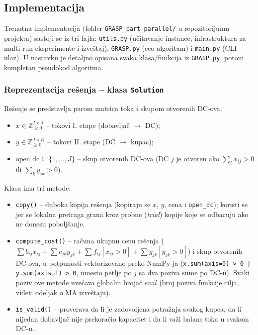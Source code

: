 \documentclass[12pt,a4paper]{article}
\begin{document}
\subsection{Implementacija}

Trenutna implementacija (folder \texttt{GRASP\_part\_parallel/} u repozitorijumu
projekta) sastoji se iz tri fajla: \texttt{utils.py} (učitavanje instance,
infrastruktura za multi-run eksperimente i izveštaj), \texttt{GRASP.py}
(ceo algoritam) i \texttt{main.py} (CLI ulaz). U nastavku je detaljno
opisana svaka klasa/funkcija iz \texttt{GRASP.py}, potom kompletan
pseudokod algoritma.

\subsubsection{Reprezentacija rešenja -- klasa \texttt{Solution}}

Rešenje se predstavlja parom matrica toka i skupom otvorenih DC-ova:
\begin{itemize}
  \item $x \in \mathbb{Z}_{\geq 0}^{I \times J}$ -- tokovi I. etape (dobavljač $\to$ DC);
  \item $y \in \mathbb{Z}_{\geq 0}^{J \times K}$ -- tokovi II. etape (DC $\to$ kupac);
  \item $\text{open\_dc} \subseteq \{1,\ldots,J\}$ -- skup otvorenih DC-ova
    (DC $j$ je otvoren ako $\sum_i x_{ij} > 0$ ili $\sum_k y_{jk} > 0$).
\end{itemize}

Klasa ima tri metode:
\begin{itemize}
  \item \texttt{copy()} -- duboka kopija rešenja (kopiraju se $x$, $y$, cena
    i \texttt{open\_dc}); koristi se jer se lokalna pretraga grana kroz
    probne (\textit{trial}) kopije koje se odbacuju ako ne donesu poboljšanje.
  \item \texttt{compute\_cost()} -- računa ukupnu cenu rešenja
    ($\sum b_{ij}x_{ij} + \sum c_{jk}y_{jk} + \sum f_{ij}[x_{ij}>0] + \sum g_{jk}[y_{jk}>0]$)
    i skup otvorenih DC-ova, u potpunosti vektorizovano preko NumPy-ja
    (\texttt{x.sum(axis=0) > 0 | y.sum(axis=1) > 0}, umesto petlje po $j$
    sa dva poziva sume po DC-u). Svaki poziv ove metode uvećava globalni
    brojač $eval$ (broj poziva funkcije cilja, videti odeljak o MA izveštaju).
  \item \texttt{is\_valid()} -- proverava da li je zadovoljena potražnja
    svakog kupca, da li nijedan dobavljač nije prekoračio kapacitet i da li
    važi balans toka u svakom DC-u.
\end{itemize}
\end{document}
